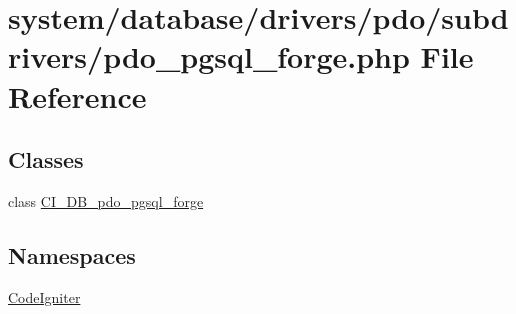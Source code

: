 \hypertarget{pdo__pgsql__forge_8php}{}\section{system/database/drivers/pdo/subdrivers/pdo\+\_\+pgsql\+\_\+forge.php File Reference}
\label{pdo__pgsql__forge_8php}
\subsection*{Classes}
\begin{DoxyCompactItemize}
\item 
class \mbox{\hyperlink{class_c_i___d_b__pdo__pgsql__forge}{C\+I\+\_\+\+D\+B\+\_\+pdo\+\_\+pgsql\+\_\+forge}}
\end{DoxyCompactItemize}
\subsection*{Namespaces}
\begin{DoxyCompactItemize}
\item 
 \mbox{\hyperlink{namespace_code_igniter}{Code\+Igniter}}
\end{DoxyCompactItemize}
